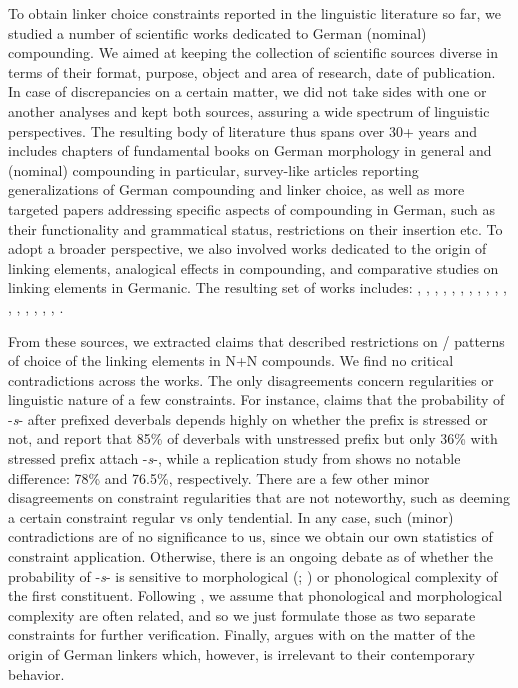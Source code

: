 \documentclass[10pt, a4paper]{article}
\begin{document}
To obtain linker choice constraints reported in the linguistic literature so far, we studied a number of scientific works dedicated to German (nominal) compounding. We aimed at keeping the collection of scientific sources diverse in terms of their format, purpose, object and area of research, date of publication. In case of discrepancies on a certain matter, we did not take sides with one or another analyses and kept both sources, assuring a wide spectrum of linguistic perspectives. The resulting body of literature thus spans over 30+ years and includes chapters of fundamental books on German morphology in general and (nominal) compounding in particular, survey-like articles reporting generalizations of German compounding and linker choice, as well as more targeted papers addressing specific aspects of compounding in German, such as their functionality and grammatical status, restrictions on their insertion etc. To adopt a broader perspective, we also involved works dedicated to the origin of linking elements, analogical effects in compounding, and comparative studies on linking elements in Germanic. The resulting set of works includes: \citep[chapter 6.2]{eisenberg_2013}, \citep{fuhrhop_kuerschner_2015}, \citep{koliopoulou_2014}, \citep{kopf_2017}, \citep{krott_etal_2007}, \citep{kuerschner_2005}, \citep{kuerschner_2010}, \citep{libben_etal_2009}, \citep{neef_borgwaldt_2012}, \citep{nuebling_szczepaniak_2008}, \citep{nuebling_szczepaniak_2013}, \citep[chapter A.5]{ortner_mueller-bollhagen_1991}, \citep[chapter 8.1]{schaefer_2018}, \citep{schaefer_pankratz_2018}, \citep{schluecker_2012}, \citep{schluecker_2023}, \citep{wegener_2003}, \citep{wegener_2005}.

From these sources, we extracted claims that described restrictions on / patterns of choice of the linking elements in N+N compounds. We find no critical contradictions across the works. The only disagreements concern regularities or linguistic nature of a few constraints. For instance, \citet{nuebling_szczepaniak_2008} claims that the probability of -\textit{s}- after prefixed deverbals depends highly on whether the prefix is stressed or not, and report that 85\% of deverbals with unstressed prefix but only 36\% with stressed prefix attach -\textit{s}-, while a replication study from \citet{kopf_2017} shows no notable difference: 78\% and 76.5\%, respectively. There are a few other minor disagreements on constraint regularities that are not noteworthy, such as deeming a certain constraint regular vs only tendential. In any case, such (minor) contradictions are of no significance to us, since we obtain our own statistics of constraint application. Otherwise, there is an ongoing debate as of whether the probability of -\textit{s}- is sensitive to morphological (\citealp{koliopoulou_2014}; \citealp{kuerschner_2005}) or phonological \citep{nuebling_szczepaniak_2008} complexity of the first constituent. Following \citet{fuhrhop_kuerschner_2015}, we assume that phonological and morphological complexity are often related, and so we just formulate those as two separate constraints for further verification. Finally, \cite{nuebling_szczepaniak_2013} argues with \citet{wegener_2003} on the matter of the origin of German linkers which, however, is irrelevant to their contemporary behavior.
\end{document}
